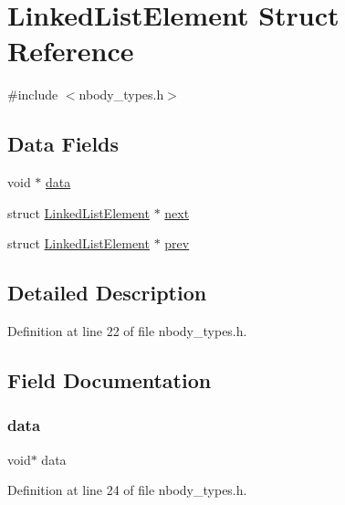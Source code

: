 \hypertarget{struct_linked_list_element}{}\section{Linked\+List\+Element Struct Reference}
\label{struct_linked_list_element}


{\ttfamily \#include $<$nbody\+\_\+types.\+h$>$}

\subsection*{Data Fields}
\begin{DoxyCompactItemize}
\item 
void $\ast$ \hyperlink{struct_linked_list_element_a735984d41155bc1032e09bece8f8d66d}{data}
\item 
struct \hyperlink{struct_linked_list_element}{Linked\+List\+Element} $\ast$ \hyperlink{struct_linked_list_element_a475866f9885e1659a1704a6b24c81af2}{next}
\item 
struct \hyperlink{struct_linked_list_element}{Linked\+List\+Element} $\ast$ \hyperlink{struct_linked_list_element_ab2a338dd2c3ebf3033210507766f2529}{prev}
\end{DoxyCompactItemize}


\subsection{Detailed Description}


Definition at line 22 of file nbody\+\_\+types.\+h.



\subsection{Field Documentation}
\hypertarget{struct_linked_list_element_a735984d41155bc1032e09bece8f8d66d}{}\label{struct_linked_list_element_a735984d41155bc1032e09bece8f8d66d} 
\subsubsection{\texorpdfstring{data}{data}}
{\footnotesize\ttfamily void$\ast$ data}



Definition at line 24 of file nbody\+\_\+types.\+h.

